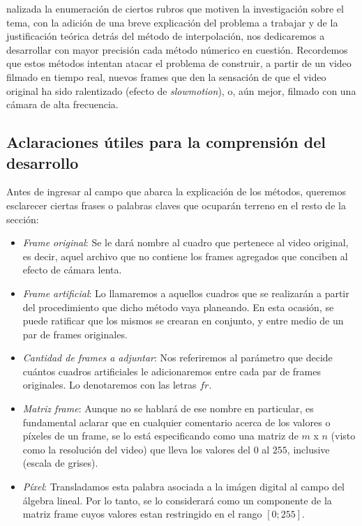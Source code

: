 
nalizada la enumeraci\'on de ciertos rubros que motiven la investigaci\'on sobre el tema, con la adici\'on de una breve explicaci\'on del problema a trabajar y de la justificación teórica detrás del método de interpolación, nos dedicaremos a desarrollar con mayor precisi\'on cada m\'etodo n\'umerico en cuesti\'on. Recordemos que estos métodos intentan atacar el problema de construir, a partir de un video filmado en tiempo real, nuevos frames que den la sensaci\'on de que el video original ha sido ralentizado (efecto de \emph{slowmotion}), o, aún mejor, filmado con una cámara de alta frecuencia.

\subsection{Aclaraciones \'utiles para la comprensi\'on del desarrollo}

Antes de ingresar al campo que abarca la explicaci\'on de los m\'etodos, queremos esclarecer ciertas frases o palabras claves que ocupar\'an terreno en el resto de la secci\'on:

\begin{itemize}
	\item \textit{Frame original}: Se le dar\'a nombre al cuadro que pertenece al video original, es decir, aquel archivo que no contiene los frames agregados que conciben al efecto de c\'amara lenta.
	\item \textit{Frame artificial}: Lo llamaremos a aquellos cuadros que se realizar\'an a partir del procedimiento que dicho m\'etodo vaya planeando. En esta ocasi\'on, se puede ratificar que los mismos se crearan en conjunto, y entre medio de un par de frames originales.
	\item \textit{Cantidad de frames a adjuntar}: Nos referiremos al par\'ametro que decide cu\'antos cuadros artificiales le adicionaremos entre cada par de frames originales. Lo denotaremos con las letras $fr$.
	\item \textit{Matriz frame}: Aunque no se hablar\'a de ese nombre en particular, es fundamental aclarar que en cualquier comentario acerca de los valores o p\'ixeles de un frame, se lo est\'a especificando como una matriz de $m$ x $n$ (visto como la resoluci\'on del video) que lleva los valores del $0$ al $255$, inclusive (escala de grises).
	\item \textit{P\'ixel}: Transladamos esta palabra asociada a la im\'agen digital al campo del \'algebra lineal. Por lo tanto, se lo considerar\'a como un componente de la matriz frame cuyos valores estan restringido en el rango $[0;255]$.
\end{itemize}

